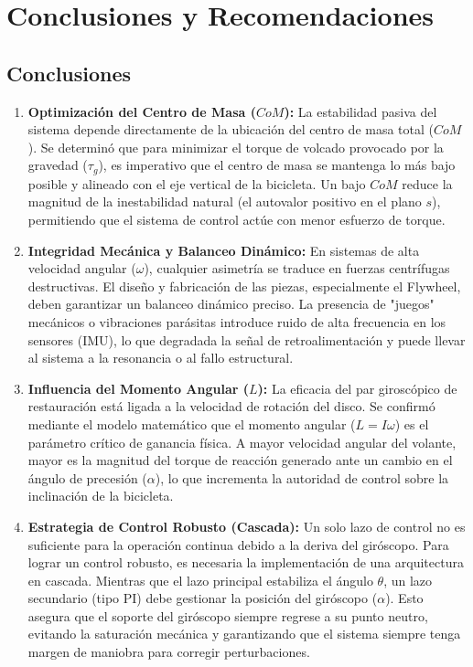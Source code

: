 \documentclass[12pt,letterpaper]{report}
\begin{document}
\chapter{Conclusiones y Recomendaciones}

\section{Conclusiones}

\begin{enumerate}
    \item \textbf{Optimización del Centro de Masa ($CoM$):} La estabilidad pasiva del sistema depende directamente de la ubicación del centro de masa total ($CoM$). Se determinó que para minimizar el torque de volcado provocado por la gravedad ($\tau_g$), es imperativo que el centro de masa se mantenga lo más bajo posible y alineado con el eje vertical de la bicicleta. Un bajo $CoM$ reduce la magnitud de la inestabilidad natural (el autovalor positivo en el plano $s$), permitiendo que el sistema de control actúe con menor esfuerzo de torque.

    \item \textbf{Integridad Mecánica y Balanceo Dinámico:} En sistemas de alta velocidad angular ($\omega$), cualquier asimetría se traduce en fuerzas centrífugas destructivas. El diseño y fabricación de las piezas, especialmente el Flywheel, deben garantizar un balanceo dinámico preciso. La presencia de "juegos" mecánicos o vibraciones parásitas introduce ruido de alta frecuencia en los sensores (IMU), lo que degradada la señal de retroalimentación y puede llevar al sistema a la resonancia o al fallo estructural.

    \item \textbf{Influencia del Momento Angular ($L$):} La eficacia del par giroscópico de restauración está ligada a la velocidad de rotación del disco. Se confirmó mediante el modelo matemático que el momento angular ($L = I\omega$) es el parámetro crítico de ganancia física. A mayor velocidad angular del volante, mayor es la magnitud del torque de reacción generado ante un cambio en el ángulo de precesión ($\alpha$), lo que incrementa la autoridad de control sobre la inclinación de la bicicleta.

    \item \textbf{Estrategia de Control Robusto (Cascada):} Un solo lazo de control no es suficiente para la operación continua debido a la deriva del giróscopo. Para lograr un control robusto, es necesaria la implementación de una arquitectura en cascada. Mientras que el lazo principal estabiliza el ángulo $\theta$, un lazo secundario (tipo PI) debe gestionar la posición del giróscopo ($\alpha$). Esto asegura que el soporte del giróscopo siempre regrese a su punto neutro, evitando la saturación mecánica y garantizando que el sistema siempre tenga margen de maniobra para corregir perturbaciones.


\end{enumerate}
\end{document}
